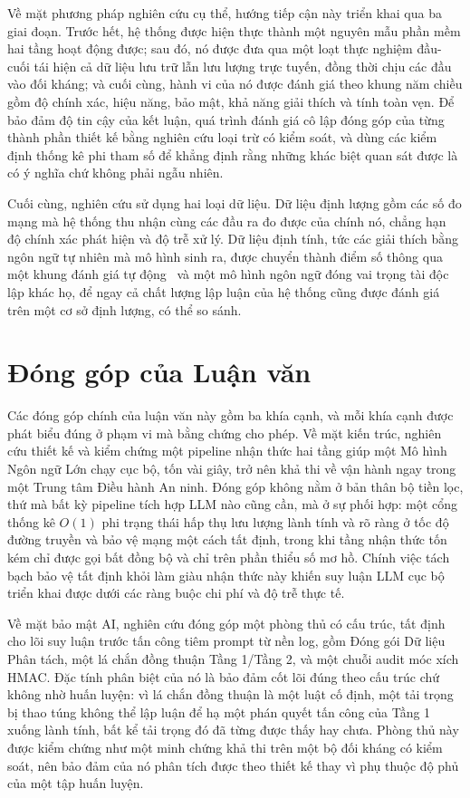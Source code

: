 Về mặt phương pháp nghiên cứu cụ thể, hướng tiếp cận này triển khai qua ba giai đoạn. Trước hết, hệ thống được hiện thực thành một nguyên mẫu phần mềm hai tầng hoạt động được; sau đó, nó được đưa qua một loạt thực nghiệm đầu-cuối tái hiện cả dữ liệu lưu trữ lẫn lưu lượng trực tuyến, đồng thời chịu các đầu vào đối kháng; và cuối cùng, hành vi của nó được đánh giá theo khung năm chiều gồm độ chính xác, hiệu năng, bảo mật, khả năng giải thích và tính toàn vẹn. Để bảo đảm độ tin cậy của kết luận, quá trình đánh giá cô lập đóng góp của từng thành phần thiết kế bằng nghiên cứu loại trừ có kiểm soát, và dùng các kiểm định thống kê phi tham số để khẳng định rằng những khác biệt quan sát được là có ý nghĩa chứ không phải ngẫu nhiên.

Cuối cùng, nghiên cứu sử dụng hai loại dữ liệu. Dữ liệu định lượng gồm các số đo mạng mà hệ thống thu nhận cùng các đầu ra đo được của chính nó, chẳng hạn độ chính xác phát hiện và độ trễ xử lý. Dữ liệu định tính, tức các giải thích bằng ngôn ngữ tự nhiên mà mô hình sinh ra, được chuyển thành điểm số thông qua một khung đánh giá tự động~\cite{ragas2023} và một mô hình ngôn ngữ đóng vai trọng tài độc lập khác họ, để ngay cả chất lượng lập luận của hệ thống cũng được đánh giá trên một cơ sở định lượng, có thể so sánh.


\section{Đóng góp của Luận văn}
Các đóng góp chính của luận văn này gồm ba khía cạnh, và mỗi khía cạnh được phát biểu đúng ở phạm vi mà bằng chứng cho phép. Về mặt kiến trúc, nghiên cứu thiết kế và kiểm chứng một pipeline nhận thức hai tầng giúp một Mô hình Ngôn ngữ Lớn chạy cục bộ, tốn vài giây, trở nên khả thi về vận hành ngay trong một Trung tâm Điều hành An ninh. Đóng góp không nằm ở bản thân bộ tiền lọc, thứ mà bất kỳ pipeline tích hợp LLM nào cũng cần, mà ở sự phối hợp: một cổng thống kê $O(1)$ phi trạng thái hấp thụ lưu lượng lành tính và rõ ràng ở tốc độ đường truyền và bảo vệ mạng một cách tất định, trong khi tầng nhận thức tốn kém chỉ được gọi bất đồng bộ và chỉ trên phần thiểu số mơ hồ. Chính việc tách bạch bảo vệ tất định khỏi làm giàu nhận thức này khiến suy luận LLM cục bộ triển khai được dưới các ràng buộc chi phí và độ trễ thực tế.

Về mặt bảo mật AI, nghiên cứu đóng góp một phòng thủ có cấu trúc, tất định cho lõi suy luận trước tấn công tiêm prompt từ nền log, gồm Đóng gói Dữ liệu Phân tách, một lá chắn đồng thuận Tầng 1/Tầng 2, và một chuỗi audit móc xích HMAC. Đặc tính phân biệt của nó là bảo đảm cốt lõi đúng theo cấu trúc chứ không nhờ huấn luyện: vì lá chắn đồng thuận là một luật cố định, một tải trọng bị thao túng không thể lập luận để hạ một phán quyết tấn công của Tầng 1 xuống lành tính, bất kể tải trọng đó đã từng được thấy hay chưa. Phòng thủ này được kiểm chứng như một minh chứng khả thi trên một bộ đối kháng có kiểm soát, nên bảo đảm của nó phân tích được theo thiết kế thay vì phụ thuộc độ phủ của một tập huấn luyện.

